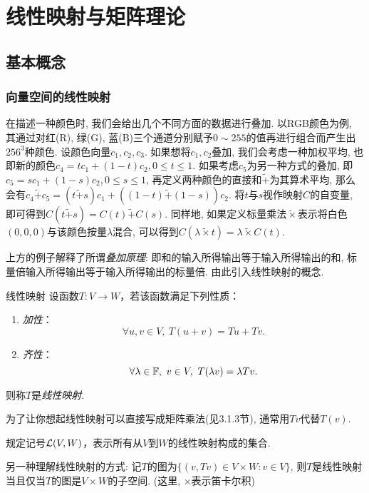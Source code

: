 \chapter{线性映射与矩阵理论}


\section{基本概念}

\subsection{向量空间的线性映射}

在描述一种颜色时, 我们会给出几个不同方面的数据进行叠加. 以RGB颜色为例, 其通过对红(R), 绿(G), 蓝(B)三个通道分别赋予$0\sim 255$的值再进行组合而产生出$256^3$种颜色. 设颜色向量$c_1,c_2,c_3$. 如果想将$c_1,c_2$叠加, 我们会考虑一种加权平均, 也即新的颜色$c_4=tc_1+(1-t)c_2, 0\leq t \leq 1$. 如果考虑$c_5$为另一种方式的叠加, 即$c_5=sc_1+(1-s)c_2, 0 \leq s \leq 1$, 再定义两种颜色的直接和$\tilde{+}$为其算术平均, 那么会有$c_4 \tilde{+} c_5= (t \tilde{+} s) c_1 + ((1-t) \tilde{+} (1-s)) c_2$. 将$t$与$s$视作映射$C$的自变量, 即可得到$C(t \tilde{+} s) = C(t) \tilde{+} C(s)$. 同样地, 如果定义标量乘法$\tilde{\times}$表示将白色$(0,0,0)$与该颜色按量$\lambda$混合, 可以得到$C(\lambda \tilde{\times} t) = \lambda \tilde{\times} C(t)$. 

上方的例子解释了所谓\textit{叠加原理}: 即和的输入所得输出等于输入所得输出的和, 标量倍输入所得输出等于输入所得输出的标量倍. 由此引入线性映射的概念. 

\begin{definition}{线性映射}
	设函数$T:V \to W$，若该函数满足下列性质：
	\begin{enumerate}
		\item \textit{加性}：$$\forall u,v \in V,~T(u+v)=Tu+Tv.$$
		\item \textit{齐性}：$$\forall \lambda \in \mathbb{F},~v \in V,~T(\lambda v)=\lambda Tv.$$
	\end{enumerate}
	则称$T$是\textit{线性映射}.
\end{definition}
\begin{remark}
	为了让你想起线性映射可以直接写成矩阵乘法(见3.1.3节), 通常用$Tv$代替$T(v)$. 
\end{remark}

规定记号$\mathcal{L} (V,W)$，表示所有从$V$到$W$的线性映射构成的集合.

另一种理解线性映射的方式: 记$T$的图为$\{ (v,Tv)\in V \times W : v \in V \}$, 则$T$是线性映射当且仅当$T$的图是$V \times W$的子空间. (这里, $\times$表示笛卡尔积)

